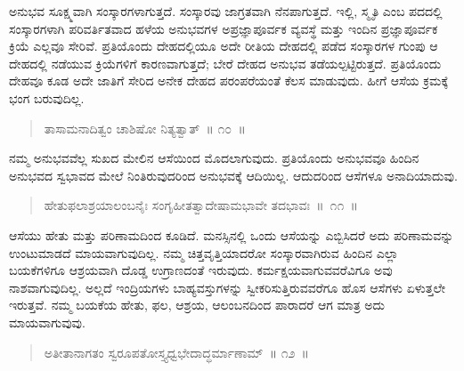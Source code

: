 \vspace{-0.3cm}


ಅನುಭವ ಸೂಕ್ಷ್ಮವಾಗಿ ಸಂಸ್ಕಾರಗಳಾಗುತ್ತದೆ. ಸಂಸ್ಕಾರವು ಜಾಗ್ರತವಾಗಿ ನೆನಪಾಗುತ್ತದೆ. ಇಲ್ಲಿ, ಸ್ಮೃತಿ ಎಂಬ ಪದದಲ್ಲಿ ಸಂಸ್ಕಾರಗಳಾಗಿ ಪರಿವರ್ತಿತವಾದ ಹಳೆಯ ಅನುಭವಗಳ ಅಪ್ರಜ್ಞಾಪೂರ್ವಕ ವ್ಯವಸ್ಥೆ ಮತ್ತು ಇಂದಿನ ಪ್ರಜ್ಞಾಪೂರ್ವಕ ಕ್ರಿಯೆ ಎಲ್ಲವೂ ಸೇರಿವೆ. ಪ್ರತಿಯೊಂದು ದೇಹದಲ್ಲಿಯೂ ಅದೇ ರೀತಿಯ ದೇಹದಲ್ಲಿ ಪಡೆದ ಸಂಸ್ಕಾರಗಳ ಗುಂಪು ಆ ದೇಹದಲ್ಲಿ ನಡೆಯುವ ಕ್ರಿಯೆಗಳಿಗೆ ಕಾರಣವಾಗುತ್ತದೆ; ಬೇರೆ ದೇಹದ ಅನುಭವ ತಡೆಯಲ್ಪಟ್ಟಿರುತ್ತದೆ. ಪ್ರತಿಯೊಂದು ದೇಹವೂ ಕೂಡ ಅದೇ ಜಾತಿಗೆ ಸೇರಿದ ಅನೇಕ ದೇಹದ ಪರಂಪರೆಯಂತೆ ಕೆಲಸ ಮಾಡುವುದು. ಹೀಗೆ ಆಸೆಯ ಕ್ರಮಕ್ಕೆ ಭಂಗ ಬರುವುದಿಲ್ಲ. 

\vspace{-0.3cm}

\begin{verse}
ತಾಸಾಮನಾದಿತ್ವಂ ಚಾಶಿಷೋ ನಿತ್ಯತ್ವಾತ್​~॥ ೧೦~॥
\end{verse}

\vspace{-0.35cm}


ನಮ್ಮ ಅನುಭವವೆಲ್ಲ ಸುಖದ ಮೇಲಿನ ಆಸೆಯಿಂದ ಮೊದಲಾಗುವುದು. ಪ್ರತಿಯೊಂದು ಅನುಭವವೂ ಹಿಂದಿನ ಅನುಭವದ ಸ್ವಭಾವದ ಮೇಲೆ ನಿಂತಿರುವುದರಿಂದ ಅನುಭವಕ್ಕೆ ಆದಿಯಿಲ್ಲ. ಆದುದರಿಂದ ಆಸೆಗಳೂ ಅನಾದಿಯಾದುವು. 

\vspace{-0.3cm}

\begin{verse}
ಹೇತುಫಲಾಶ್ರಯಾಲಂಬನೈಃ ಸಂಗೃಹೀತತ್ವಾದೇಷಾಮಭಾವೇ ತದಭಾವಃ~॥~೧೧~॥
\end{verse}

\vspace{-0.35cm}


ಆಸೆಯು ಹೇತು ಮತ್ತು ಪರಿಣಾಮದಿಂದ ಕೂಡಿದೆ. ಮನಸ್ಸಿನಲ್ಲಿ ಒಂದು ಆಸೆಯನ್ನು ಎಬ್ಬಿಸಿದರೆ ಅದು ಪರಿಣಾಮವನ್ನು ಉಂಟುಮಾಡದೆ ಮಾಯವಾಗುವುದಿಲ್ಲ. ನಮ್ಮ ಚಿತ್ತವೃತ್ತಿಯಾದರೋ ಸಂಸ್ಕಾರವಾಗಿರುವ ಹಿಂದಿನ ಎಲ್ಲಾ ಬಯಕೆಗಳಿಗೂ ಆಶ್ರಯವಾಗಿ ದೊಡ್ಡ ಉಗ್ರಾಣದಂತೆ ಇರುವುದು. ಕರ್ಮಕ್ಷಯವಾಗುವವರೆವಿಗೂ ಅವು ನಾಶವಾಗುವುದಿಲ್ಲ. ಅಲ್ಲದೆ ಇಂದ್ರಿಯಗಳು ಬಾಹ್ಯವಸ್ತುಗಳನ್ನು ಸ್ವೀಕರಿಸುತ್ತಿರುವವರೆಗೂ ಹೊಸ ಆಸೆಗಳು ಏಳುತ್ತಲೇ ಇರುತ್ತವೆ. ನಮ್ಮ ಬಯಕೆಯ ಹೇತು, ಫಲ, ಆಶ್ರಯ, ಆಲಂಬನದಿಂದ ಪಾರಾದರೆ ಆಗ ಮಾತ್ರ ಅದು ಮಾಯವಾಗುವುವು. 

\vspace{-0.3cm}

\begin{verse}
ಅತೀತಾನಾಗತಂ ಸ್ವರೂಪತೋಸ್ತ್ಯಧ್ವಭೇದಾದ್ಧರ್ಮಾಣಾಮ್​~॥ ೧೨~॥
\end{verse}


